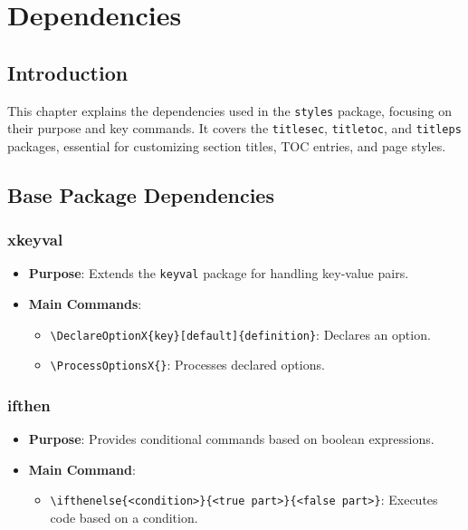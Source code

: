 \documentclass[12pt,twoside]{report}
\begin{document}
\chapter{Dependencies}
\section*{Introduction}
This chapter explains the dependencies used in the \texttt{styles} package, focusing on their purpose and key commands. It covers the \texttt{titlesec}, \texttt{titletoc}, and \texttt{titleps} packages, essential for customizing section titles, TOC entries, and page styles.

\section{Base Package Dependencies}

\subsection{xkeyval}
\begin{itemize}
    \item \textbf{Purpose}: Extends the \texttt{keyval} package for handling key-value pairs.
    \item \textbf{Main Commands}:
    \begin{itemize}
        \item \verb|\DeclareOptionX{key}[default]{definition}|: Declares an option.
        \item \verb|\ProcessOptionsX{}|: Processes declared options.
    \end{itemize}
\end{itemize}

\subsection{ifthen}
\begin{itemize}
    \item \textbf{Purpose}: Provides conditional commands based on boolean expressions.
    \item \textbf{Main Command}:
    \begin{itemize}
        \item \verb|\ifthenelse{<condition>}{<true part>}{<false part>}|: Executes code based on a condition.
    \end{itemize}
\end{itemize}
\end{document}
